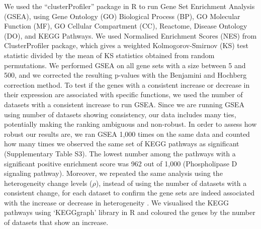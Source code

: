 \documentclass[12pt,twoside]{unicam}
\begin{document}
We used the ``clusterProfiler'' package in R to run Gene Set Enrichment Analysis (GSEA), using Gene Ontology (GO) Biological Process (BP), GO Molecular Function (MF), GO Cellular Compartment (CC), Reactome, Disease Ontology (DO), and KEGG Pathways. We used Normalised Enrichment Scores (NES) from ClusterProfiler package, which gives a weighted Kolmogorov-Smirnov (KS) test statistic divided by the mean of KS statistics obtained from random permutations. We performed GSEA on all gene sets with a size between 5 and 500, and we corrected the resulting p-values with the Benjamini and Hochberg correction method. To test if the genes with a consistent increase or decrease in their expression are associated with specific functions, we used the number of datasets with a consistent increase to run GSEA. Since we are running GSEA using number of datasets showing consistency, our data includes many ties, potentially making the ranking ambiguous and non-robust. In order to assess how robust our results are, we ran GSEA 1,000 times on the same data and counted how many times we observed the same set of KEGG pathways as significant (Supplementary Table S3). The lowest number among the pathways with a significant positive enrichment score was 962 out of 1,000 (Phospholipase D signaling pathway). Moreover, we repeated the same analysis using the heterogeneity change levels (\(\rho\)), instead of using the number of datasets with a consistent change, for each dataset to confirm the gene sets are indeed associated with the increase or decrease in heterogeneity
. We visualised the KEGG pathways using `KEGGgraph' library in R and coloured the genes by the number of datasets that show an increase.
\end{document}
